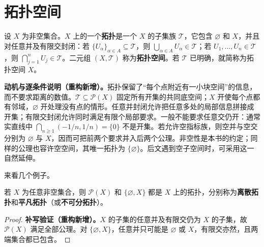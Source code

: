 \documentclass[../../main.tex]{subfiles}%
\begin{document}
\section{拓扑空间}\label{section:ch04-topological-spaces}
\begin{definition}[拓扑与拓扑空间]\label{definition:ch04-topology}
设 $X$ 为非空集合。$X$ 上的一个\textbf{拓扑}是一个 $X$ 的子集族 $\mathcal T$，它包含 $\varnothing$ 和 $X$，并且对任意并及有限交封闭：若 $\{U_\alpha\}_{\alpha\in A}\subseteq\mathcal T$，则 $\bigcup_{\alpha\in A}U_\alpha\in\mathcal T$；若 $U_1,\ldots,U_n\in\mathcal T$，则 $\bigcap_{j=1}^nU_j\in\mathcal T$。二元组 $(X,\mathcal T)$ 称为\textbf{拓扑空间}。若 $\mathcal T$ 已明确，就简称为拓扑空间 $X$。
\end{definition}
\begin{remark}
\textbf{动机与逐条件说明（重构新增）。}拓扑保留了“每个点附近有一小块空间”的信息，而不要求距离的数值。$\mathcal T\subseteq\mathscr P(X)$ 固定所有开集的共同底空间；$X$ 开使每个点都有邻域，$\varnothing$ 开处理没有点的情形。任意并封闭允许把任意多处的局部信息拼接成开集；有限交封闭允许同时满足有限个局部要求。一般不能要求任意交仍开：通常实直线中 $\bigcap_{n\ge1}(-1/n,1/n)=\{0\}$ 不是开集。若允许空指标族，则空并与空交分别为 $\varnothing$ 与 $X$，因而可把前两个要求并入后两个公理。非空性是本书的约定；同样的公理也容许空空间，其唯一拓扑为 $\{\varnothing\}$。后文遇到空子空间时，可采用这一自然延伸。
\end{remark}
来看几个例子。
\begin{definition}[离散拓扑与平凡拓扑]\label{definition:ch04-discrete-indiscrete}
若 $X$ 为任意非空集合，则 $\mathscr P(X)$ 和 $\{\varnothing,X\}$ 都是 $X$ 上的拓扑，分别称为\textbf{离散拓扑}和\textbf{平凡拓扑}（或\textbf{不可分拓扑}）。
\end{definition}
\begin{proof}
\textbf{补写验证（重构新增）。}$X$ 的子集的任意并及有限交仍为 $X$ 的子集，故 $\mathscr P(X)$ 满足全部公理。对 $\{\varnothing,X\}$，任意并只可能是 $\varnothing$ 或 $X$，有限交亦然，且两端集合都已包含。
\end{proof}
\end{document}

